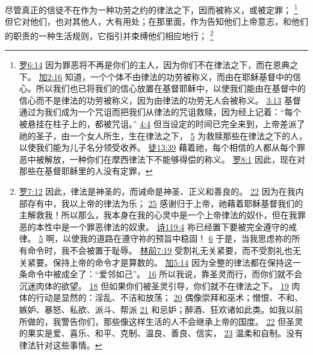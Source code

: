 \documentclass[12pt, a4paper, oneside]{ctexart}
\newcounter{parnum}[section]
\newcommand{\N}{%
   \noindent\refstepcounter{parnum}%
    \makebox[\parindent][l]{\textbf{\arabic{parnum}.}}}
\begin{document}
\N 尽管真正的信徒不在作为一种功劳之约的律法之下，因而被称义，或被定罪；
	\footnote {
		\href{https://biblehub.com/romans/6-14.htm}{罗6:14} 因为罪恶将不再是你们的主人，因为你们不在律法之下，而在恩典之下。
		\href{https://biblehub.com/galatians/2-16.htm}{加2:16} 知道，一个个体不由律法的功劳被称义，而由在耶稣基督中的信心。所以我们也已将我们的信心放置在基督耶稣中，以使我们能由在基督中的信心而不是律法的功劳被称义，因为由律法的功劳无人会被称义。
		\href{https://biblehub.com/galatians/3-13.htm}{3:13} 基督通过为我们成为一个咒诅而把我们从律法的咒诅救赎，因为经上记着：“每个被悬挂在柱子上的，都被咒诅。”
		\href{https://biblehub.com/galatians/4-4.htm}{4:4} 但当设定的时间已完全来到，上帝差派了祂的圣子，由一个女人所生，生在律法之下，
		\href{https://biblehub.com/galatians/4-5.htm}{5} 为救赎那些在律法之下的人，以使我们能为儿子名分领受收养。
        \href{https://biblehub.com/acts/13-39.htm}{徒13:39} 藉着祂，每个相信的人都从每个罪恶中被解放，一种你们在摩西律法下不能够得偿的称义。
		\href{https://biblehub.com/romans/8-1.htm}{罗8:1} 因此，现在对那些在基督耶稣里的人没有定罪，
	}
	但它对他们，也对其他人，大有用处；在那里面，作为告知他们上帝意志，和他们的职责的一种生活规则，它指引并束缚他们相应地行；
	\footnote {
		\href{https://biblehub.com/romans/7-12.htm}{罗7:12} 因此，律法是神圣的，而诫命是神圣、正义和善良的。
        \href{https://biblehub.com/romans/7-22.htm}{22} 因为在我内部存有中，我以上帝的律法为乐；
		\href{https://biblehub.com/romans/7-25.htm}{25} 感谢归于上帝，祂藉着耶稣基督我们的主解救我！所以那么，我本身在我的心灵中是一个上帝律法的奴仆，但在我罪恶的本性中是一个罪恶律法的奴隶。
		\href{https://biblehub.com/psalms/119-4.htm}{诗119:4} 祢已经置下要被完全遵守的戒律。
		\href{https://biblehub.com/psalms/119-5.htm}{5} 啊，以使我的道路在遵守祢的预旨中稳固！
		\href{https://biblehub.com/psalms/119-6.htm}{6} 于是，当我思虑祢的所有命令时，我不会被置于耻辱。
		\href{https://biblehub.com/1_corinthians/7-19.htm}{林前7:19} 受割礼无关紧要，而不受割礼也无关紧要。保持上帝的命令才是算数的。
		\href{https://biblehub.com/galatians/5-14.htm}{加5:14} 因为全整的律法都在保持这一条命令中被成全了：“爱邻如己”。
		\href{https://biblehub.com/galatians/5-16.htm}{16} 所以我说，靠圣灵而行，而你们就不会沉迷肉体的欲望。
		\href{https://biblehub.com/galatians/5-18.htm}{18} 但如果你们被圣灵引导，你们就不在律法之下。
		\href{https://biblehub.com/galatians/5-19.htm}{19} 肉体的行动是显然的：淫乱、不洁和放荡；
		\href{https://biblehub.com/galatians/5-20.htm}{20} 偶像崇拜和巫术；憎恨、不和、嫉妒、暴怒、私欲、派斗、帮派
		\href{https://biblehub.com/galatians/5-21.htm}{21} 和忌妒；醉酒、狂欢诸如此类。如我以前所做的，我警告你们，那些像这样生活的人不会继承上帝的国度。
		\href{https://biblehub.com/galatians/5-22.htm}{22} 但圣灵的果实是爱、喜乐、和平、克制、温良、善良、信实，
		\href{https://biblehub.com/galatians/5-23.htm}{23} 温柔和自制。没有律法针对这些事情。
	}
\end{document}
